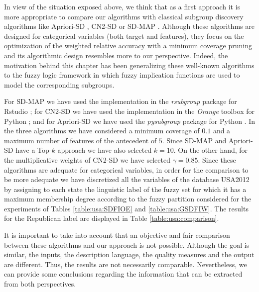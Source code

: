 In view of the situation exposed above, we think that as a first approach it is more appropriate to compare our algorithms with classical subgroup discovery algorithms like Apriori-SD \cite{Kavsek2003}, CN2-SD \cite{Lavrac2004} or SD-MAP \cite{Atzmueller2006}. Although these algorithms are designed for categorical variables (both target and features), they focus on the optimization of the weighted relative accuracy with a minimum coverage pruning and its algorithmic design resembles more to our perspective. Indeed, the motivation behind this chapter has been generalizing these well-known algorithms to the fuzzy logic framework in which fuzzy implication functions are used to model the corresponding subgroups.

For SD-MAP we have used the implementation in the \textit{rsubgroup} package for Rstudio \cite{rsubgroup}; for CN2-SD we have used the implementation in the \textit{Orange} toolbox for Python \cite{orange};   and for Apriori-SD we have used the \textit{pysubgroup} package for Python \cite{pysubgroup}. In the three algorithms we have considered a minimum coverage of $0.1$ and a maximum number of features of the antecedent of $5$. Since SD-MAP and Apriori-SD have a Top-$k$ approach we have also selected $k=10$. On the other hand, for the multiplicative weights of CN2-SD we have selected $\gamma=0.85$. Since these algorithms are adequate for categorical variables, in order for the comparison to be more adequate we have discretized all the variables of the database USA2012 by assigning to each state the linguistic label of the fuzzy set for which it has a maximum membership degree according to the fuzzy partition considered for the experiments of Tables \ref{table:usa:SDFIOE} and \ref{table:usa:GSDFIW}. The results for the Republican label are displayed in Table \ref{table:usa:comparison}.

It is important to take into account that an objective and fair comparison between these algorithms and our approach is not possible. Although the goal is similar, the inputs, the description language, the quality measures and the output are different. Thus, the results are not necessarily comparable. Nevertheless, we can provide some conclusions regarding the information that can be extracted from both perspectives.

